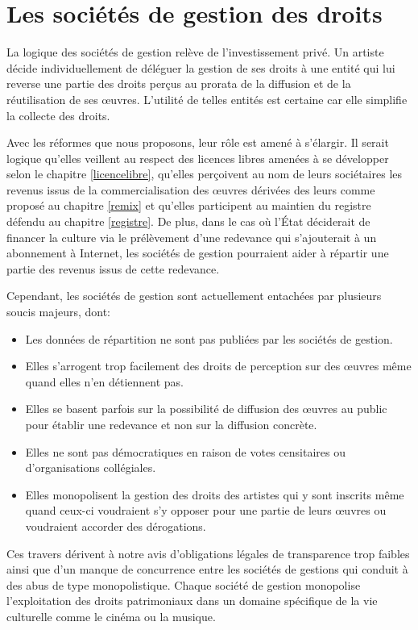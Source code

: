 \section{Les sociétés de gestion des droits}

La logique des sociétés de gestion relève de l'investissement privé. Un artiste décide individuellement de déléguer la gestion de ses droits à une entité qui lui reverse une partie des droits perçus au prorata de la diffusion et de la réutilisation de ses œuvres. L'utilité de telles entités est certaine car elle simplifie la collecte des droits. 

Avec les réformes que nous proposons, leur rôle est amené à s'élargir. Il serait logique qu'elles veillent au respect des licences libres amenées à se développer selon le chapitre \ref{licencelibre}, qu'elles perçoivent au nom de leurs sociétaires les revenus issus de la commercialisation des œuvres dérivées des leurs comme proposé au chapitre \ref{remix} et qu'elles participent au maintien du registre défendu au chapitre \ref{registre}. De plus, dans le cas où l'État déciderait de financer la culture via le prélèvement d'une redevance qui s'ajouterait à un abonnement à Internet, les sociétés de gestion pourraient aider à répartir une partie des revenus issus de cette redevance.

Cependant, les sociétés de gestion sont actuellement entachées par plusieurs soucis majeurs, dont:

\begin{itemize}
\item Les données de répartition ne sont pas publiées par les sociétés de gestion.
\item Elles s'arrogent trop facilement des droits de perception sur des œuvres même quand elles n'en détiennent pas.
\item Elles se basent parfois sur la possibilité de diffusion des œuvres au public pour établir une redevance et non sur la diffusion concrète.
\item Elles ne sont pas démocratiques en raison de votes censitaires ou d'organisations collégiales.
\item Elles monopolisent la gestion des droits des artistes qui y sont inscrits même quand ceux-ci voudraient s'y opposer pour une partie de leurs œuvres ou voudraient accorder des dérogations.
\end{itemize}

Ces travers dérivent à notre avis d'obligations légales de transparence trop faibles ainsi que d'un manque de concurrence entre les sociétés de gestions qui conduit à des abus de type monopolistique. Chaque société de gestion monopolise l'exploitation des droits patrimoniaux dans un domaine spécifique de la vie culturelle comme le cinéma ou la musique. 

